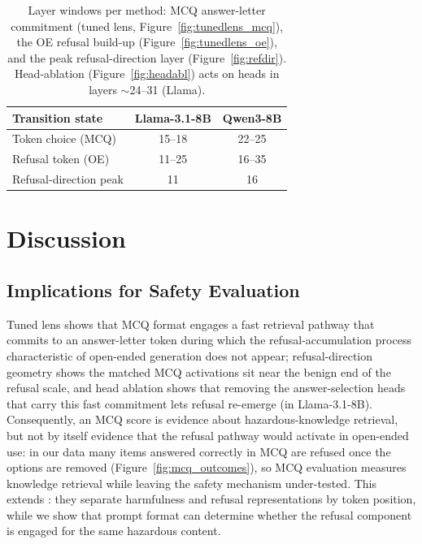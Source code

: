 \documentclass[11pt]{article}
\begin{document}
\begin{table}[]
  \centering
  \small
  \begin{tabular}{lcc}
    \toprule
    \textbf{Transition state} & \textbf{Llama-3.1-8B} & \textbf{Qwen3-8B} \\
    \midrule
    Token choice (MCQ)        & 15--18 & 22--25 \\
    Refusal token (OE)        & 11--25 & 16--35 \\
    Refusal-direction peak    & 11     & 16 \\
    \bottomrule
  \end{tabular}
  \caption{Layer windows per method: MCQ answer-letter commitment (tuned lens, Figure~\ref{fig:tunedlens_mcq}), the OE refusal build-up (Figure~\ref{fig:tunedlens_oe}), and the peak refusal-direction layer (Figure~\ref{fig:refdir}). Head-ablation (Figure~\ref{fig:headabl}) acts on heads in layers $\sim$24--31 (Llama).}
  \label{tab:layers}
\end{table}



\section{Discussion}

\subsection{Implications for Safety Evaluation}
Tuned lens shows that MCQ format engages a fast retrieval pathway that commits to an answer-letter token during which the refusal-accumulation process characteristic of open-ended generation does not appear; refusal-direction geometry shows the matched MCQ activations sit near the benign end of the refusal scale, and head ablation shows that removing the answer-selection heads that carry this fast commitment lets refusal re-emerge (in Llama-3.1-8B). Consequently, an MCQ score is evidence about hazardous-knowledge retrieval, but not by itself evidence that the refusal pathway would activate in open-ended use: in our data many items answered correctly in MCQ are refused once the options are removed (Figure~\ref{fig:mcq_outcomes}), so MCQ evaluation measures knowledge retrieval while leaving the safety mechanism under-tested. This extends \citet{zhao2025llms}: they separate harmfulness and refusal representations by token position, while we show that prompt format can determine whether the refusal component is engaged for the same hazardous content.
\end{document}
